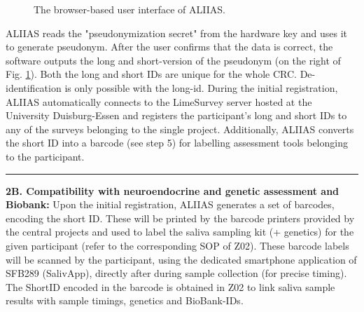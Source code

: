 \begin{figure}[H]
{}
\hfill
{}
\caption{The browser-based user interface of ALIIAS.}
\label{fig:screenshots}
\end{figure}

ALIIAS reads the "pseudonymization secret" from the hardware key and uses it to generate pseudonym. After the user confirms that the data is correct, the software outputs the long and short-version of the pseudonym (on the right of Fig. \ref{fig:screenshots}). Both the long and short IDs are unique for the whole CRC. De-identification is only possible with the long-id. During the initial registration, ALIIAS automatically connects to the LimeSurvey server hosted at the University Duisburg-Essen and registers the participant's long and short IDs to any of the surveys belonging to the single project. Additionally, ALIIAS converts the short ID into a barcode (see step 5) for labelling assessment tools belonging to the participant.

\par\noindent\rule{\textwidth\color{pniblue}}{0.4pt} 
\textbf{2B. Compatibility with neuroendocrine and genetic assessment and Biobank:} Upon the initial registration, ALIIAS generates a set of barcodes, encoding the short ID. These will be printed by the barcode printers provided by the central projects and used to label the saliva sampling kit (+ genetics) for the given participant (refer to the corresponding SOP of Z02). These barcode labels will be scanned by the participant, using the dedicated smartphone application of SFB289 (SalivApp), directly after during sample collection (for precise timing). The ShortID encoded in the barcode is obtained in Z02 to link saliva sample results with sample timings, genetics and BioBank-IDs.

